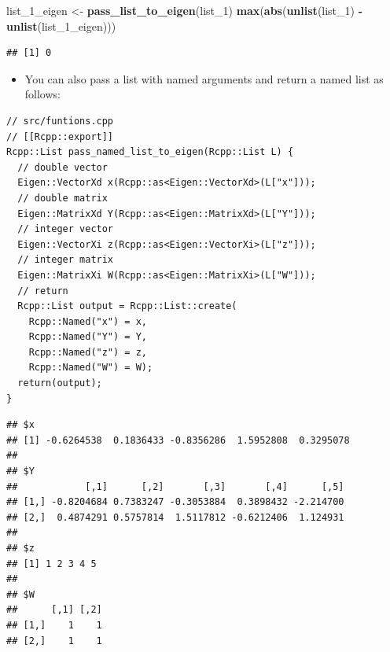 \documentclass[]{book}
\newenvironment{Shaded}{\begin{snugshade}}{\end{snugshade}}
\newcommand{\KeywordTok}[1]{\textcolor[rgb]{0.13,0.29,0.53}{\textbf{#1}}}
\newcommand{\DecValTok}[1]{\textcolor[rgb]{0.00,0.00,0.81}{#1}}
\newcommand{\StringTok}[1]{\textcolor[rgb]{0.31,0.60,0.02}{#1}}
\newcommand{\CommentTok}[1]{\textcolor[rgb]{0.56,0.35,0.01}{\textit{#1}}}
\newcommand{\OperatorTok}[1]{\textcolor[rgb]{0.81,0.36,0.00}{\textbf{#1}}}
\newcommand{\NormalTok}[1]{#1}
\providecommand{\tightlist}{%
  \setlength{\itemsep}{0pt}\setlength{\parskip}{0pt}}
\begin{document}
\begin{Shaded}
\begin{Highlighting}[]
\NormalTok{list_1_eigen <-}\StringTok{ }\KeywordTok{pass_list_to_eigen}\NormalTok{(list_}\DecValTok{1}\NormalTok{)}
\KeywordTok{max}\NormalTok{(}\KeywordTok{abs}\NormalTok{(}\KeywordTok{unlist}\NormalTok{(list_}\DecValTok{1}\NormalTok{) }\OperatorTok{-}\StringTok{ }\KeywordTok{unlist}\NormalTok{(list_1_eigen)))}
\end{Highlighting}
\end{Shaded}

\begin{verbatim}
## [1] 0
\end{verbatim}

\begin{itemize}
\tightlist
\item
  You can also pass a list with named arguments and return a named list
  as follows:
\end{itemize}

\begin{verbatim}
// src/funtions.cpp
// [[Rcpp::export]]
Rcpp::List pass_named_list_to_eigen(Rcpp::List L) {
  // double vector
  Eigen::VectorXd x(Rcpp::as<Eigen::VectorXd>(L["x"]));
  // double matrix
  Eigen::MatrixXd Y(Rcpp::as<Eigen::MatrixXd>(L["Y"]));
  // integer vector
  Eigen::VectorXi z(Rcpp::as<Eigen::VectorXi>(L["z"]));
  // integer matrix
  Eigen::MatrixXi W(Rcpp::as<Eigen::MatrixXi>(L["W"]));
  // return
  Rcpp::List output = Rcpp::List::create(
    Rcpp::Named("x") = x, 
    Rcpp::Named("Y") = Y, 
    Rcpp::Named("z") = z, 
    Rcpp::Named("W") = W);
  return(output);
}
\end{verbatim}

\begin{Shaded}
\end{Shaded}

\begin{verbatim}
## $x
## [1] -0.6264538  0.1836433 -0.8356286  1.5952808  0.3295078
## 
## $Y
##            [,1]      [,2]       [,3]       [,4]      [,5]
## [1,] -0.8204684 0.7383247 -0.3053884  0.3898432 -2.214700
## [2,]  0.4874291 0.5757814  1.5117812 -0.6212406  1.124931
## 
## $z
## [1] 1 2 3 4 5
## 
## $W
##      [,1] [,2]
## [1,]    1    1
## [2,]    1    1
\end{verbatim}
\end{document}
